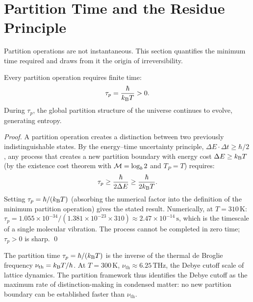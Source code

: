 \section{Partition Time and the Residue Principle}
\label{sec:partition_time}

Partition operations are not instantaneous. This section quantifies the
minimum time required and draws from it the origin of irreversibility.

\begin{theorem}
\label{thm:partition_time}
Every partition operation requires finite time:
\begin{equation}
  \tau_p = \frac{\hbar}{k_{\mathrm{B}} T} > 0.
  \label{eq:partition_time}
\end{equation}
During $\tau_p$, the global partition structure of the universe continues to
evolve, generating entropy.
\end{theorem}

\begin{proof}
A partition operation creates a distinction between two previously
indistinguishable states. By the energy--time uncertainty principle,
$\Delta E \cdot \Delta t \geq \hbar/2$, any process that creates a new
partition boundary with energy cost $\Delta E \geq k_{\mathrm{B}} T$ (by the existence
cost theorem with $\mathcal{M} = \log_b 2$ and $T_P = T$) requires:
\begin{equation}
  \tau_p \geq \frac{\hbar}{2 \Delta E} \geq \frac{\hbar}{2k_{\mathrm{B}} T}.
\end{equation}
Setting $\tau_p = \hbar / (k_{\mathrm{B}} T)$ (absorbing the numerical factor into the
definition of the minimum partition operation) gives the stated result.
Numerically, at $T = 310\,\mathrm{K}$:
$\tau_p = 1.055 \times 10^{-34} / (1.381 \times 10^{-23} \times 310)
\approx 2.47 \times 10^{-14}\,\mathrm{s}$,
which is the timescale of a single molecular vibration. The process cannot
be completed in zero time; $\tau_p > 0$ is sharp. \qed
\end{proof}

\begin{remark}
The partition time $\tau_p = \hbar/(k_{\mathrm{B}} T)$ is the inverse of the thermal
de Broglie frequency $\nu_{\mathrm{th}} = k_{\mathrm{B}} T / h$. At $T = 300\,\mathrm{K}$,
$\nu_{\mathrm{th}} \approx 6.25\,\mathrm{THz}$, the Debye cutoff scale of
lattice dynamics. The partition framework thus identifies the Debye cutoff as
the maximum rate of distinction-making in condensed matter: no new partition
boundary can be established faster than $\nu_{\mathrm{th}}$.
\end{remark}


